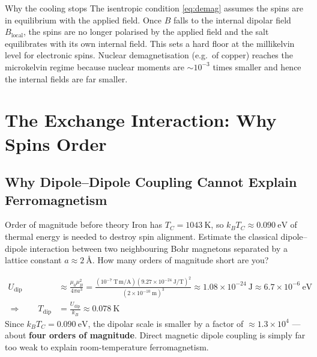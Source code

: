 \documentclass[11pt,a4paper]{article}
\newcommand{\Ang}{\text{\AA}}
\begin{document}
\begin{pitfallbox}{Why the cooling stops}
The isentropic condition \eqref{eq:demag} assumes the spins are in equilibrium with the applied field. Once $B$ falls to the internal dipolar field $B_{\mathrm{local}}$, the spins are no longer polarised by the applied field and the salt equilibrates with its own internal field. This sets a hard floor at the millikelvin level for electronic spins. Nuclear demagnetisation (e.g.\ of copper) reaches the microkelvin regime because nuclear moments are $\sim10^{-3}$ times smaller and hence the internal fields are far smaller.
\end{pitfallbox}

\clearpage
\section{The Exchange Interaction: Why Spins Order}
\label{ch:exchange}

\subsection{Why Dipole--Dipole Coupling Cannot Explain Ferromagnetism}

\begin{checkpointbox}{Order of magnitude before theory}
Iron has $T_C = 1043\ \mathrm{K}$, so $k_BT_C \approx 0.090\ \mathrm{eV}$ of thermal energy is needed to destroy spin alignment. Estimate the classical dipole--dipole interaction between two neighbouring Bohr magnetons separated by a lattice constant $a\approx2\ \Ang$. How many orders of magnitude short are you?
\end{checkpointbox}

\begin{align}
    U_{\mathrm{dip}} &\approx \frac{\mu_0\mu_B^2}{4\pi a^3}
    = \frac{(10^{-7}\ \mathrm{T\,m/A})(9.27\times10^{-24}\ \mathrm{J/T})^2}{(2\times10^{-10}\ \mathrm{m})^3}
    \approx 1.08\times10^{-24}\ \mathrm{J}
    \approx 6.7\times10^{-6}\ \mathrm{eV}
    \label{eq:dipenergy}\\
    \Longrightarrow\qquad
    T_{\mathrm{dip}} &= \frac{U_{\mathrm{dip}}}{k_B} \approx 0.078\ \mathrm{K}
    \label{eq:dipenergyT}
\end{align}
Since $k_BT_C = 0.090\ \mathrm{eV}$, the dipolar scale is smaller by a factor of $\approx 1.3\times10^{4}$ --- about \textbf{four orders of magnitude}. Direct magnetic dipole coupling is simply far too weak to explain room-temperature ferromagnetism.
\end{document}
